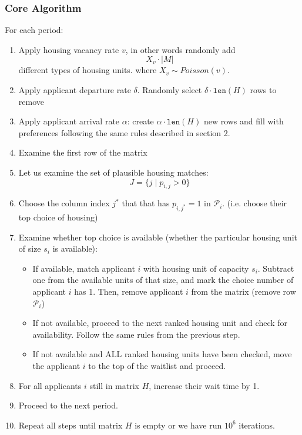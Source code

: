 \documentclass[11pt]{article}
\begin{document}
\subsubsection{Core Algorithm}
\newline
For each period:
\begin{enumerate}
    \item Apply housing vacancy rate $v$, in other words randomly add
    \[X_v \cdot |M|\]
    different types of housing units.
    where $X_v \sim Poisson(v)$.
    \item Apply applicant departure rate $\delta$. Randomly select $\delta \cdot \texttt{len}(H)$ rows to remove
    \item Apply applicant arrival rate $\alpha$: create $\alpha \cdot \texttt{len}(H)$ new rows and fill with preferences following the same rules described in section 2.
    \item Examine the first row of the matrix
    \item Let us examine the set of plausible housing matches:
    \[J = \{j \mid p_{i,j} > 0\}\]
    \item Choose the column index $j^*$ that that has $p_{i,j^*} = 1$ in $\mathcal{P}_i$. (i.e. choose their top choice of housing)
    \item Examine whether top choice is available (whether the particular housing unit of size $s_i$ is available):
        \begin{itemize}
        \item If available, match applicant $i$ with housing unit of capacity $s_i$. Subtract one from the available units of that size, and mark the choice number of applicant $i$ has 1. Then, remove applicant $i$ from the matrix (remove row $\mathcal{P}_i$)
        \item If not available, proceed to the next ranked housing unit and check for availability. Follow the same rules from the previous step.
        \item If not available and ALL ranked housing units have been checked, move the applicant $i$ to the top of the waitlist and proceed. 
    \end{itemize}
    \item For all applicants $i$ still in matrix $H$, increase their wait time by 1. 
    \item Proceed to the next period. 
    \item Repeat all steps until matrix $H$ is empty or we have run $10^6$ iterations.
\end{enumerate}
\end{document}
